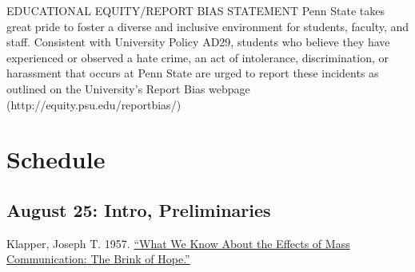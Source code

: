 \vspace{-.1in}\documentclass[11pt]{article}
\begin{document}
EDUCATIONAL EQUITY/REPORT BIAS STATEMENT 
Penn State takes great pride to foster a diverse and inclusive environment for students, faculty, and staff. Consistent with University Policy AD29, students who believe they have experienced or observed a hate crime, an act of intolerance, discrimination, or harassment that occurs at Penn State are urged to report these incidents as outlined on the University’s Report Bias webpage (http://equity.psu.edu/reportbias/)



\clearpage
\section*{Schedule}




\subsection*{August 25: Intro, Preliminaries}


\noindent Klapper, Joseph T. 1957. \href{https://watermark.silverchair.com/21-4-453.pdf?token=AQECAHi208BE49Ooan9kkhW_Ercy7Dm3ZL_9Cf3qfKAc485ysgAAAs0wggLJBgkqhkiG9w0BBwagggK6MIICtgIBADCCAq8GCSqGSIb3DQEHATAeBglghkgBZQMEAS4wEQQMho7zGTx9t3T_ErajAgEQgIICgPuR5xBHXGjGXaVgc66B2Zsg9ziPqpPSZA2YxcbxfwZy_NN_dUqfGTsHmkXsEmyk5UaYYnWYssEyMEZeAD8J3kILu0vzWEzYDDKWPY4p9P-cLcAX3X74kqI3LIyVq96kym4rD3zedbz2_LBHk5QSFhG0_xEkyaAGs5su571S6pQEifcqI0l_3sEvBou0Nx7Lq_WGj34FR6IWHQsqdWY7lEc0f1Iss2AN1z07znTRMRsTzm2Syf8C2tgu3NDN-kSxylJRovP9vWnLvkadAuTqk6Jih4tz_HcV3SzlQQD7EXcloLNKkyeQJyG-3pgcN0mZuChfmgt6FWpcbWEcFZQoa_RZ80eIOYsEGv3uoi82uWGBPCrhA1GfauZFlJk6s_1YIj9Ze_ojor2fVY4-Cewxdv71foRzEDwXG5-01oRciUQtrvQSj6hDxHnuweGgkkGKftNfbh8-AmtthffuqGrKEcpGTicJfU_fBcNXTOBJ9vCMAV5i-U0VI7aPg_ivvWH2hSPjjDKa8gYzjQ36jxpLhX_2CkSnga0BaETmKu83RR62dWXWXJoT8nFAMamZIC5puXSinkB8D6yS8xalVTpkKLsMk727-MeVNtyfqn7tVYZ0UAwYO54YgO3onO3CqaPCx7ZZgH4xqXSRIyuiTrwYH7VG5OrsSoFgqcyyQLTzijeBBgtBbNvzPcyN3WQJFfuF8fKLXKFGg4zq5HfgkwNz_qxsv7f8yygWTcBUvUHLJmJNFsAPiIQsQqdLGW4pVALsfPW0BQXcNN2O7xf6fJyAQxdFbGBpEQjLpObcJTs5Xl3r7NzcnQvGp7F3z9avnPePMYVzwMtIDh3wWgB8sGDd1sg}{``What We Know About the Effects of Mass Communication: The Brink of Hope.''}
\end{document}

